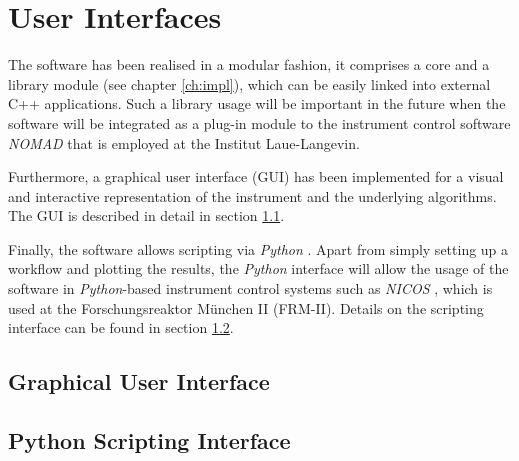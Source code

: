 %
%

\chapter{User Interfaces}
\label{ch:gui}

The software has been realised in a modular fashion, it comprises a core
and a library module (see chapter \ref{ch:impl}), which can be easily linked 
into external C++ applications. Such a library usage will be important in the
future when the software will be integrated as a plug-in module to the instrument
control software \textit{NOMAD} \cite{NOMAD} that is employed at the Institut 
Laue-Langevin.

Furthermore, a graphical user interface (GUI) has been implemented for a visual
and interactive representation of the instrument and the underlying algorithms.
The GUI is described in detail in section \ref{sec:gui}.

Finally, the software allows scripting via \textit{Python} \cite{Python}. 
Apart from simply setting up a workflow and plotting the results, the \textit{Python}
interface will allow the usage of the software in \textit{Python}-based instrument
control systems such as \textit{NICOS} \cite{NICOS}, which is used at the 
Forschungsreaktor M\"unchen II (FRM-II). 
Details on the scripting interface can be found in section \ref{sec:scripting}.





\section{Graphical User Interface}
\label{sec:gui}






\section{Python Scripting Interface}
\label{sec:scripting}
